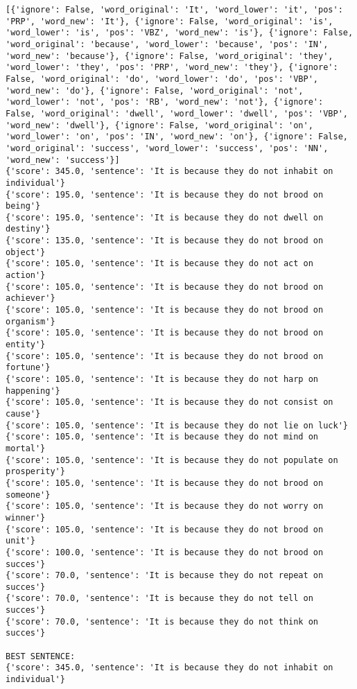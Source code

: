 \documentclass[12pt,a4paper,oneside]{book}
\begin{document}
\begin{verbatim}
[{'ignore': False, 'word_original': 'It', 'word_lower': 'it', 'pos': 'PRP', 'word_new': 'It'}, {'ignore': False, 'word_original': 'is', 'word_lower': 'is', 'pos': 'VBZ', 'word_new': 'is'}, {'ignore': False, 'word_original': 'because', 'word_lower': 'because', 'pos': 'IN', 'word_new': 'because'}, {'ignore': False, 'word_original': 'they', 'word_lower': 'they', 'pos': 'PRP', 'word_new': 'they'}, {'ignore': False, 'word_original': 'do', 'word_lower': 'do', 'pos': 'VBP', 'word_new': 'do'}, {'ignore': False, 'word_original': 'not', 'word_lower': 'not', 'pos': 'RB', 'word_new': 'not'}, {'ignore': False, 'word_original': 'dwell', 'word_lower': 'dwell', 'pos': 'VBP', 'word_new': 'dwell'}, {'ignore': False, 'word_original': 'on', 'word_lower': 'on', 'pos': 'IN', 'word_new': 'on'}, {'ignore': False, 'word_original': 'success', 'word_lower': 'success', 'pos': 'NN', 'word_new': 'success'}]
{'score': 345.0, 'sentence': 'It is because they do not inhabit on individual'}
{'score': 195.0, 'sentence': 'It is because they do not brood on being'}
{'score': 195.0, 'sentence': 'It is because they do not dwell on destiny'}
{'score': 135.0, 'sentence': 'It is because they do not brood on object'}
{'score': 105.0, 'sentence': 'It is because they do not act on action'}
{'score': 105.0, 'sentence': 'It is because they do not brood on achiever'}
{'score': 105.0, 'sentence': 'It is because they do not brood on organism'}
{'score': 105.0, 'sentence': 'It is because they do not brood on entity'}
{'score': 105.0, 'sentence': 'It is because they do not brood on fortune'}
{'score': 105.0, 'sentence': 'It is because they do not harp on happening'}
{'score': 105.0, 'sentence': 'It is because they do not consist on cause'}
{'score': 105.0, 'sentence': 'It is because they do not lie on luck'}
{'score': 105.0, 'sentence': 'It is because they do not mind on mortal'}
{'score': 105.0, 'sentence': 'It is because they do not populate on prosperity'}
{'score': 105.0, 'sentence': 'It is because they do not brood on someone'}
{'score': 105.0, 'sentence': 'It is because they do not worry on winner'}
{'score': 105.0, 'sentence': 'It is because they do not brood on unit'}
{'score': 100.0, 'sentence': 'It is because they do not brood on succes'}
{'score': 70.0, 'sentence': 'It is because they do not repeat on succes'}
{'score': 70.0, 'sentence': 'It is because they do not tell on succes'}
{'score': 70.0, 'sentence': 'It is because they do not think on succes'}

BEST SENTENCE:
{'score': 345.0, 'sentence': 'It is because they do not inhabit on individual'}



\end{verbatim}
\end{document}
